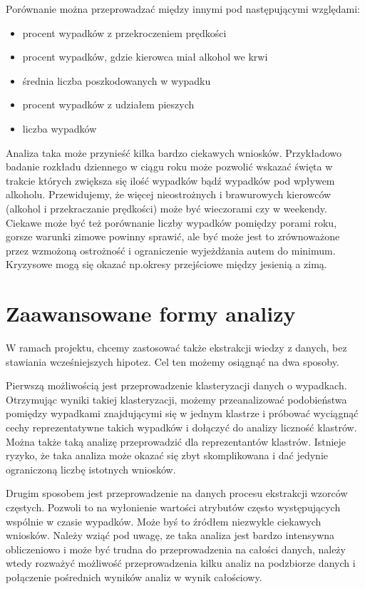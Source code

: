 Porównanie można przeprowadzać między innymi pod następującymi
względami:

\begin{itemize}
\itemsep-14pt\parskip0pt
\item
  procent wypadków z przekroczeniem prędkości\\
\item
  procent wypadków, gdzie kierowca miał alkohol we krwi\\
\item
  średnia liczba poszkodowanych w wypadku\\
\item
  procent wypadków z udziałem pieszych\\
\item
  liczba wypadków
\end{itemize}

Analiza taka może przynieść kilka bardzo ciekawych wniosków. Przykładowo
badanie rozkładu dziennego w ciągu roku może pozwolić wskazać święta w
trakcie których zwiększa się ilość wypadków bądź wypadków pod wpływem
alkoholu. Przewidujemy, że więcej nieostrożnych i brawurowych kierowców
(alkohol i przekraczanie prędkości) może być wieczorami czy w weekendy.
Ciekawe może być też porównanie liczby wypadków pomiędzy porami roku,
gorsze warunki zimowe powinny sprawić, ale być może jest to zrównoważone
przez wzmożoną ostrożność i ograniczenie wyjeżdżania autem do minimum.
Kryzysowe mogą się okazać np.okresy przejściowe między jesienią a zimą.

\section{Zaawansowane formy
analizy}\label{zaawansowane-formy-analizy}

W ramach projektu, chcemy zastosować także ekstrakcji wiedzy z danych,
bez stawiania wcześniejszych hipotez. Cel ten możemy osiągnąć na dwa
sposoby.

Pierwszą możliwością jest przeprowadzenie klasteryzacji danych o
wypadkach. Otrzymując wyniki takiej klasteryzacji, możemy przeanalizować
podobieństwa pomiędzy wypadkami znajdującymi się w jednym klastrze i
próbować wyciągnąć cechy reprezentatywne takich wypadków i dołączyć do
analizy liczność klastrów. Można także taką analizę przeprowadzić dla
reprezentantów klastrów. Istnieje ryzyko, że taka analiza może okazać
się zbyt skomplikowana i dać jedynie ograniczoną liczbę istotnych
wniosków.

Drugim sposobem jest przeprowadzenie na danych procesu ekstrakcji
wzorców częstych. Pozwoli to na wyłonienie wartości atrybutów często
występujących wspólnie w czasie wypadków. Może byś to źródłem niezwykle
ciekawych wniosków. Należy wziąć pod uwagę, ze taka analiza jest bardzo
intensywna obliczeniowo i może być trudna do przeprowadzenia na całości
danych, należy wtedy rozważyć możliwość przeprowadzenia kilku analiz na
podzbiorze danych i połączenie pośrednich wyników analiz w wynik
całościowy.
